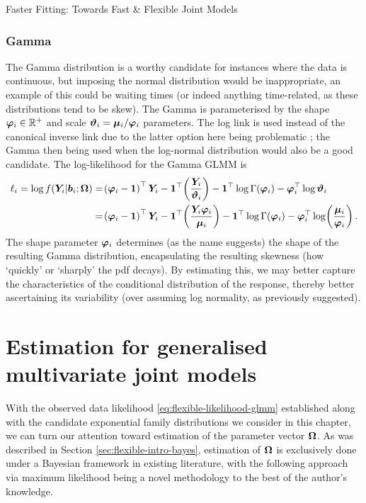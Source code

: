 \begin{chapter}{\label{cha:flexible}Faster Fitting: Towards Fast \& Flexible Joint Models}
\subsubsection*{Gamma}
The Gamma distribution is a worthy candidate for instances where the data is continuous, but imposing the normal distribution would be inappropriate, an example of this could be waiting times (or indeed anything time-related, as these distributions tend to be skew). The Gamma is parameterised by the shape $\bm{\varphi}_i\in\mathbb{R}^+$ and scale $\bm{\vartheta}_i=\bm{\mu}_i/\bm{\varphi}_i$ parameters. The log link is used instead of the canonical inverse link due to the latter option here being problematic \citep{BolkerGLMMFAQ}; the Gamma then being used when \eg the log-normal distribution would also be a good candidate. The log-likelihood for the Gamma GLMM is
\begin{align}
        \ell_i=\log f\lb\Y|\b;\bO\rb &= \lb\bphi-\bm{1}\rb^\top\Y-\boneT\lb\frac{\Y}{\bm{\vartheta}_i}\rb-\boneT\lgam{\bphi}-\bphi^\top\log\bm{\vartheta}_i \nonumber \\
        &=\lb\bphi-\bm{1}\rb^\top\Y-\boneT\lb\frac{\Y\bphi}{\bmu}\rb-\boneT\lgam{\bphi}-\bphi^\top\log\lb\frac{\bmu}{\bphi}\rb.
\label{eq:flexible-Gamma-ll}
\end{align}
The shape parameter $\bm{\varphi}_i$ determines (as the name suggests) the shape of the resulting Gamma distribution, encapsulating the resulting skewness (\ie how `quickly' or `sharply' the pdf decays). By estimating this, we may better capture the characteristics of the conditional distribution of the response, thereby better ascertaining its variability (over \eg assuming log normality, as previously suggested).
\resettocmain
\section{Estimation for generalised multivariate joint models}
With the observed data likelihood \eqref{eq:flexible-likelihood-glmm} established along with the candidate exponential family distributions we consider in this chapter, we can turn our attention toward estimation of the parameter vector $\bm{\mathrm{\Omega}}$. As was described in Section \ref{sec:flexible-intro-bayes}, estimation of $\bm{\mathrm{\Omega}}$ is exclusively done under a Bayesian framework in existing literature, with the following approach via maximum likelihood being a novel methodology to the best of the author's knowledge. 


\end{chapter}
